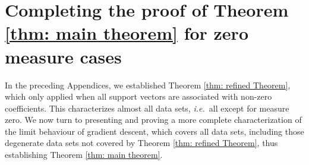 \documentclass[twoside,11pt,english]{article}
\begin{document}
\section{Completing the proof of Theorem  \ref{thm: main theorem} for zero measure cases \label{sec: proof of degenerate case}}

In the preceding Appendices, we established Theorem \ref{thm: refined Theorem}, which only applied when all support vectors are associated with non-zero coefficients.  This characterizes almost all data sets, \emph{i.e.}~all except for measure zero.  We now turn to presenting and proving a more complete characterization of the limit behaviour of gradient descent, which covers all data sets, including those degenerate data sets not covered by Theorem \ref{thm: refined Theorem}, thus establishing Theorem \ref{thm: main theorem}.

\newcommand{\barP}{\bar{\mathbf{P}}}
\newcommand{\barS}{\bar{\set}}
\end{document}
